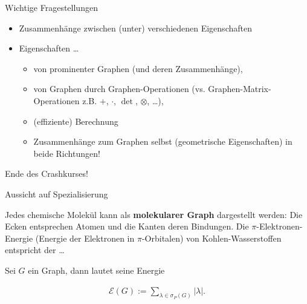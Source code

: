 \documentclass[aspectratio=169]{beamer}
\begin{document}
\begin{frame}{Wichtige Fragestellungen}

  \begin{block}{}

    \begin{itemize}

      \item Zusammenhänge zwischen (unter) verschiedenen  Eigenschaften

      \item {} Eigenschaften \dots

      \begin{itemize}
        \item von prominenter Graphen (und deren Zusammenhänge),
        \item von Graphen durch Graphen-Operationen (vs. Graphen-Matrix-Operationen z.B. $+$, $\cdot$, $\det$, $\otimes$, \dots),
        \item (effiziente) Berechnung
        \item Zusammenhänge zum Graphen selbst (geometrische Eigenschaften) in beide Richtungen!
      \end{itemize}

    \end{itemize}

  \end{block}

\end{frame}

\begin{frame}{}

  \begin{block}{}

    {
      \centering
      \huge
      Ende des Crashkurses!
    }

  \end{block}

\end{frame}

\appendix

\begin{frame}{Aussicht auf Spezialisierung}

  Jedes chemische Molekül kann als \textbf{molekularer Graph} dargestellt werden:
  Die Ecken entsprechen Atomen und die Kanten deren Bindungen.
  Die $\pi$-Elektronen-Energie (Energie der Elektronen in $\pi$-Orbitalen) von Kohlen-Wasserstoffen entspricht der \dots
  
  \begin{definition*}

    Sei $G$ ein Graph, dann lautet seine Energie

    \begin{align*}
      \mathcal E(G)
      :=
      \sum_{\lambda \in \sigma_P(G)} |\lambda|.
    \end{align*}

  \end{definition*}

\end{frame}
\end{document}
